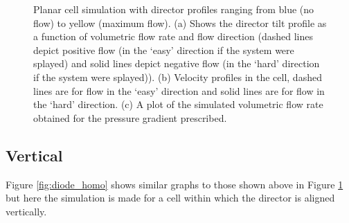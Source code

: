 \begin{figure}
\begin{center}
\end{center}
\caption[Simulated tilt, velocity and pressure gradients for a planar cell]{\label{fig:diode_planar}Planar cell simulation with director profiles ranging from blue (no flow) to yellow (maximum flow). (a) Shows the director tilt profile as a function of volumetric flow rate and flow direction (dashed lines depict positive flow (in the `easy' direction if the system were splayed) and solid lines depict negative flow (in the `hard' direction if the system were splayed)). (b) Velocity profiles in the cell, dashed lines are for flow in the `easy' direction and solid lines are for flow in the `hard' direction. (c) A plot of the simulated volumetric flow rate obtained for the pressure gradient prescribed.}
\end{figure}

\subsection{Vertical}
Figure \ref{fig:diode_homo} shows similar graphs to those shown above in Figure \ref{fig:diode_planar} but here the simulation is made for a cell  within which the director is aligned vertically.


